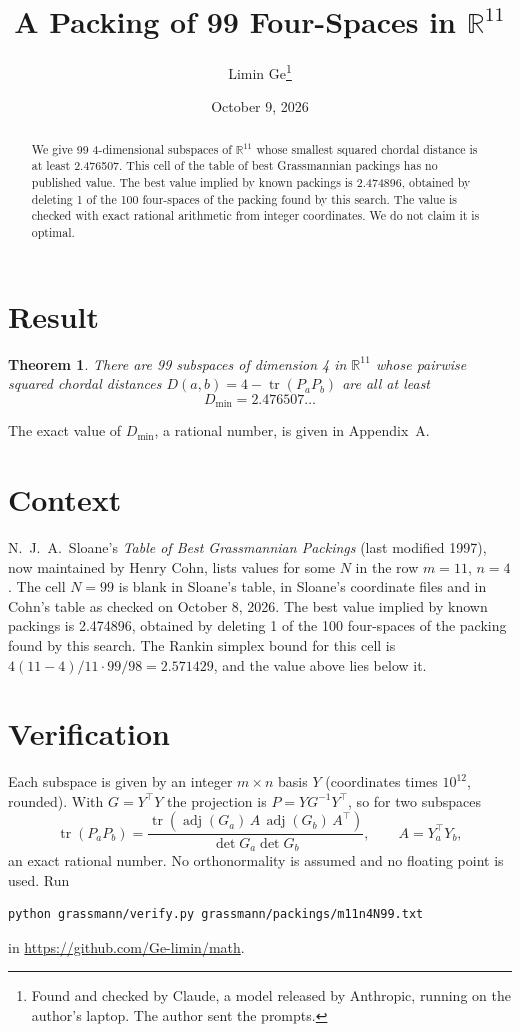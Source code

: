\documentclass[11pt,a4paper]{article}
\title{A Packing of 99 Four-Spaces in $\mathbb{R}^{11}$}
\author{Limin Ge\thanks{Found and checked by Claude, a model released by Anthropic, running on the author's laptop. The author sent the prompts.}}
\date{October 9, 2026}
\newtheorem*{theorem}{Theorem}
\begin{document}
\maketitle
\begin{abstract}
We give 99 4-dimensional subspaces of $\mathbb{R}^{11}$ whose smallest squared chordal distance is at least 2.476507. This cell of the table of best Grassmannian packings has no published value. The best value implied by known packings is 2.474896, obtained by deleting 1 of the 100 four-spaces of the packing found by this search. The value is checked with exact rational arithmetic from integer coordinates. We do not claim it is optimal.
\end{abstract}

\section{Result}
\begin{theorem}
There are 99 subspaces of dimension 4 in $\mathbb{R}^{11}$ whose pairwise squared chordal distances $D(a,b) = 4 - \operatorname{tr}(P_aP_b)$ are all at least
\[ D_{\min} = 2.476507\ldots \]
\end{theorem}
The exact value of $D_{\min}$, a rational number, is given in Appendix~A.


\section{Context}
N.~J.~A.~Sloane's \emph{Table of Best Grassmannian Packings} (last modified 1997), now maintained by Henry Cohn, lists values for some $N$ in the row $m=11$, $n=4$. The cell $N=99$ is blank in Sloane's table, in Sloane's coordinate files and in Cohn's table as checked on October 8, 2026. The best value implied by known packings is 2.474896, obtained by deleting 1 of the 100 four-spaces of the packing found by this search. The Rankin simplex bound for this cell is $4(11-4)/11\cdot 99/98 = 2.571429$, and the value above lies below it.


\section{Verification}
Each subspace is given by an integer $m\times n$ basis $Y$ (coordinates times $10^{12}$, rounded). With $G=Y^\top Y$ the projection is $P=YG^{-1}Y^\top$, so for two subspaces
\[ \operatorname{tr}(P_aP_b)=\frac{\operatorname{tr}(\operatorname{adj}(G_a)\,A\,\operatorname{adj}(G_b)\,A^\top)}{\det G_a\det G_b},\qquad A=Y_a^\top Y_b, \]
an exact rational number. No orthonormality is assumed and no floating point is used. Run
\begin{verbatim}
python grassmann/verify.py grassmann/packings/m11n4N99.txt
\end{verbatim}
in \url{https://github.com/Ge-limin/math}.
\end{document}
